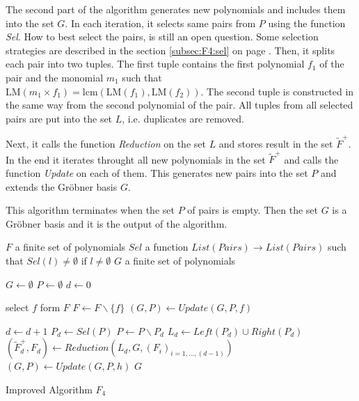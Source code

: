 The second part of the algorithm generates new polynomials and includes them into the set $G$. In each iteration, it selects same pairs from $P$ using the function \textit{Sel}. How to best select the pairs, is still an open question. Some selection strategies are described in the section \ref{subsec:F4:sel} on page \pageref{subsec:F4:sel}. Then, it splits each pair into two tuples. The first tuple contains the first polynomial $f_1$ of the pair and the monomial $m_1$ such that $\textrm{LM}(m_1 \times f_1) = \textrm{lcm}(\textrm{LM}(f_1),\textrm{LM}(f_2))$. The second tuple is constructed in the same way from the second polynomial of the pair. All tuples from all selected pairs are put into the set $L$, i.e. duplicates are removed.

Next, it calls the function \textit{Reduction} on the set $L$ and stores result in the set $\tilde{F}^+$. In the end it iterates throught all new polynomials in the set $\tilde{F}^+$ and calls the function \textit{Update} on each of them. This generates new pairs into the set $P$ and extends the Gr\"obner basis $G$.

This algorithm terminates when the set $P$ of pairs is empty. Then the set $G$ is a Gr\"obner basis and it is the output of the algorithm.

\begin{algorithm}[ht]
  \begin{algorithmic}[1]
    \Require
      \Statex $F$ a finite set of polynomials
      \Statex $Sel$ a function $List(Pairs) \to List(Pairs)$ such that $Sel(l) \neq \emptyset$ if $l\neq\emptyset$
    \Ensure
      \Statex $G$ a finite set of polynomials
      \Statex

    \State $G \gets \emptyset$
    \State $P \gets \emptyset$
    \State $d \gets 0$

      \State select $f$ form $F$
      \State $F \gets F\backslash \{f\}$
      \State $(G, P) \gets Update(G, P, f)$
    \EndWhile
    
      \State $d \gets d + 1$
      \State $P_d \gets Sel(P)$
      \State $P \gets P\backslash P_d$
      \State $L_d \gets Left(P_d) \cup Right(P_d)$
      \State $(\tilde{F}^+_d, F_d) \gets Reduction(L_d, G, (F_i)_{i=1,\ldots,(d-1)})$
        \State $(G, P) \gets Update(G, P, h)$
      \EndFor
    \EndWhile
    \State \Return $G$

  \end{algorithmic}
  \caption{Improved Algorithm $F_4$}
\end{algorithm}

